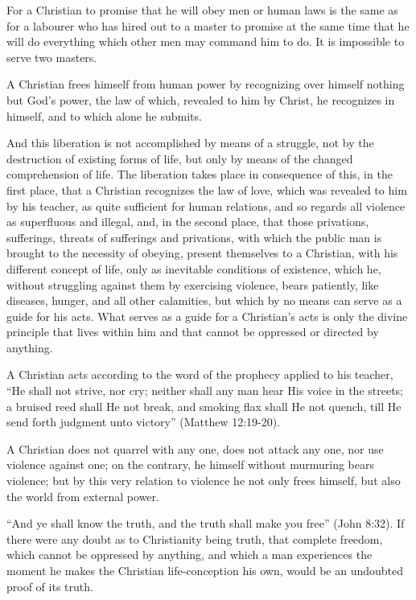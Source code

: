 \documentclass{book}
\begin{document}
For a Christian to promise that he will obey men or human laws is the same as for a labourer who has hired out to a master to promise at the same time that he will do everything which other men may command him to do. It is impossible to serve two masters.

A Christian frees himself from human power by recognizing over himself nothing but God’s power, the law of which, revealed to him by Christ, he recognizes in himself, and to which alone he submits.

And this liberation is not accomplished by means of a struggle, not by the destruction of existing forms of life, but only by means of the changed comprehension of life. The liberation takes place in consequence of this, in the first place, that a Christian recognizes the law of love, which was revealed to him by his teacher, as quite sufficient for human relations, and so regards all violence as superfluous and illegal, and, in the second place, that those privations, sufferings, threats of sufferings and privations, with which the public man is brought to the necessity of obeying, present themselves to a Christian, with his different concept of life, only as inevitable conditions of existence, which he, without struggling against them by exercising violence, bears patiently, like diseases, hunger, and all other calamities, but which by no means can serve as a guide for his acts. What serves as a guide for a Christian’s acts is only the divine principle that lives within him and that cannot be oppressed or directed by anything.

A Christian acts according to the word of the prophecy applied to his teacher, “He shall not strive, nor cry; neither shall any man hear His voice in the streets; a bruised reed shall He not break, and smoking flax shall He not quench, till He send forth judgment unto victory” (Matthew 12:19-20).

A Christian does not quarrel with any one, does not attack any one, nor use violence against one; on the contrary, he himself without murmuring bears violence; but by this very relation to violence he not only frees himself, but also the world from external power.

“And ye shall know the truth, and the truth shall make you free” (John 8:32). If there were any doubt as to Christianity being truth, that complete freedom, which cannot be oppressed by anything, and which a man experiences the moment he makes the Christian life-conception his own, would be an undoubted proof of its truth.
\end{document}

